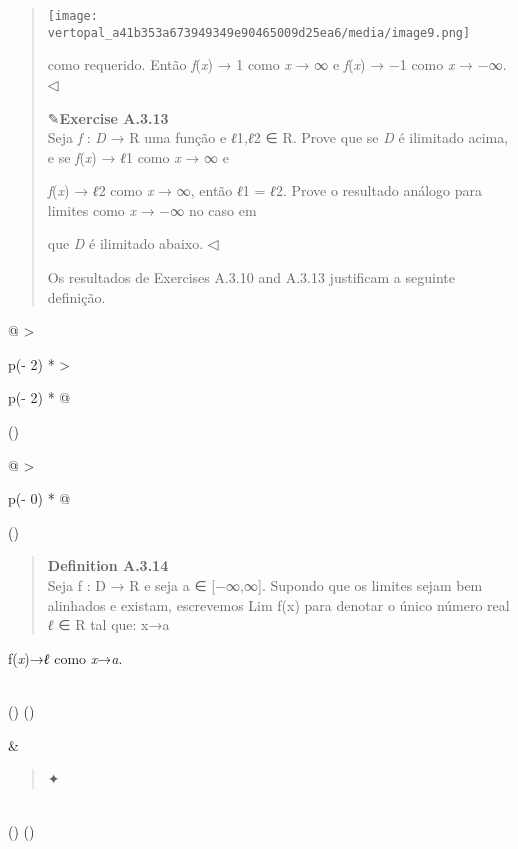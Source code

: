\documentclass[
]{article}
\begin{document}
\begin{quote}
\texttt{[image: vertopal\_a41b353a673949349e90465009d25ea6/media/image9.png]}

como requerido. Então \emph{f}(\emph{x}) → 1 como \emph{x} → ∞ e
\emph{f}(\emph{x}) → −1 como \emph{x} → −∞. ◁

✎\textbf{Exercise A.3.13}\\
Seja \emph{f} : \emph{D} → R uma função e \emph{ℓ}1\emph{,ℓ}2 ∈ R. Prove
que se \emph{D} é ilimitado acima, e se \emph{f}(\emph{x}) → \emph{ℓ}1
como \emph{x} → ∞ e

\emph{f}(\emph{x}) → \emph{ℓ}2 como \emph{x} → ∞, então \emph{ℓ}1 =
\emph{ℓ}2. Prove o resultado análogo para limites como \emph{x} → −∞ no
caso em

que \emph{D} é ilimitado abaixo. ◁

Os resultados de Exercises A.3.10 and A.3.13 justificam a seguinte
definição.
\end{quote}

\begin{longtable}[]{@{}
  >{\raggedright\arraybackslash}p{(\columnwidth - 2\tabcolsep) * }
  >{\raggedright\arraybackslash}p{(\columnwidth - 2\tabcolsep) * }@{}}
\toprule()
\begin{minipage}[b]{\linewidth}\raggedright
\begin{longtable}[]{@{}
  >{\raggedright\arraybackslash}p{(\columnwidth - 0\tabcolsep) * }@{}}
\toprule()
\begin{minipage}[b]{\linewidth}\raggedright
\begin{quote}
\textbf{Definition A.3.14}\\
Seja f : D → R e seja a ∈ {[}−∞,∞{]}. Supondo que os limites sejam bem
alinhados e existam, escrevemos Lim f(x) para denotar o único número
real \emph{ℓ} ∈ R tal que: x→a
\end{quote}

f(\emph{x})→\emph{ℓ} como \emph{x}→\emph{a}.\strut
\end{minipage} \\
\midrule()
\endhead
\bottomrule()
\end{longtable}\strut
\end{minipage} & \begin{minipage}[b]{\linewidth}\raggedright
\begin{quote}
✦
\end{quote}
\end{minipage} \\
\midrule()
\endhead
\bottomrule()
\end{longtable}
\end{document}

